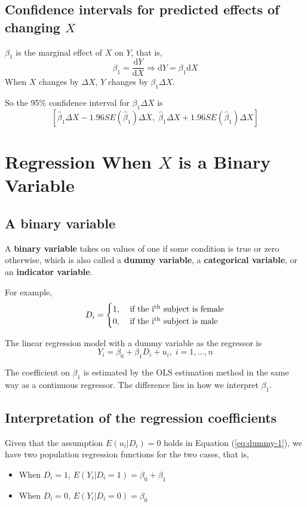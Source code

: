 \documentclass[a4paper,11pt]{article}
\newcommand{\dx}{\mathrm{d}}
\begin{document}
\subsection{Confidence intervals for predicted effects of changing \(X\)}
\label{sec:org898bb1c}
\(\beta_1\) is the marginal effect of \(X\) on \(Y\), that is, 
\[ \beta_1 = \frac{\dx Y}{ \dx X} \Rightarrow \dx Y = \beta_1 \dx X \]
When \(X\) changes by \(\Delta X\), \(Y\) changes by \(\beta_1 \Delta X\). 

So the 95\% confidence interval for \(\beta_1 \Delta X\) is
\[ \left[ \hat{\beta}_1 \Delta X - 1.96 SE(\hat{\beta}_1) \Delta X,\;
\hat{\beta}_1 \Delta X + 1.96SE(\hat{\beta}_1) \Delta X \right] \]

\section{Regression When \(X\) is a Binary Variable}
\label{sec:org7455dc7}
\subsection{A binary variable}
\label{sec:org2c84394}
A \textbf{binary variable}  takes on values of one if some condition is true or zero
otherwise, which is also called a \textbf{dummy variable}, a \textbf{categorical
variable}, or an \textbf{indicator variable}. 

For example, 
\begin{equation*}
D_i = 
\begin{cases}
1,\; &\text{if the i\textsuperscript{th} subject is female} \\
0,\; &\text{if the i\textsuperscript{th} subject is male} 
\end{cases}
\end{equation*}

The linear regression model with a dummy variable as the regressor is
\begin{equation}
\label{eq:dummy-1}
Y_i = \beta_0 + \beta_1 D_i + u_i,\; i = 1, \ldots, n
\end{equation}

The coefficient on \(\beta_1\) is estimated by the OLS estimation method
in the same way as a continuous regressor. The difference lies in how
we interpret \(\beta_1\). 

\subsection{Interpretation of the regression coefficients}
\label{sec:org4996dee}
Given that the assumption \(E(u_i | D_i) = 0\) holds in Equation
(\ref{eq:dummy-1}), we have two population regression functions for
the two cases, that is,
\begin{itemize}
\item When \(D_i = 1\), \(E(Y_i|D_i = 1) = \beta_0 + \beta_1\)
\item When \(D_i = 0\), \(E(Y_i|D_i = 0) = \beta_0\)
\end{itemize}
\end{document}
